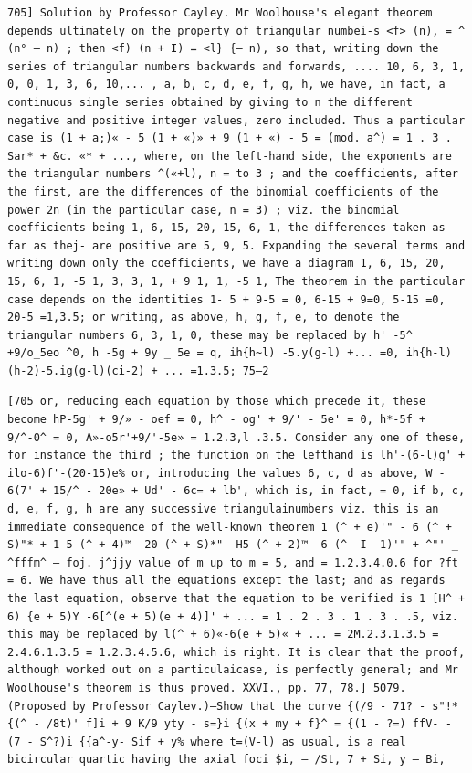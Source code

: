 \documentclass[12pt]{article}
\theoremstyle{plain}
\begin{document}
\newpage
\setcounter{page}{595}
\begin{verbatim}
705] Solution by Professor Cayley. Mr Woolhouse's elegant theorem depends ultimately on the property of triangular numbei-s <f> (n), = ^ (n° — n) ; then <f) (n + I) = <l} {— n), so that, writing down the series of triangular numbers backwards and forwards, .... 10, 6, 3, 1, 0, 0, 1, 3, 6, 10,... , a, b, c, d, e, f, g, h, we have, in fact, a continuous single series obtained by giving to n the different negative and positive integer values, zero included. Thus a particular case is (1 + a;)« - 5 (1 + «)» + 9 (1 + «) - 5 = (mod. a^) = 1 . 3 . Sar* + &c. «* + ..., where, on the left-hand side, the exponents are the triangular numbers ^(«+l), n = to 3 ; and the coefficients, after the first, are the differences of the binomial coefficients of the power 2n (in the particular case, n = 3) ; viz. the binomial coefficients being 1, 6, 15, 20, 15, 6, 1, the differences taken as far as thej- are positive are 5, 9, 5. Expanding the several terms and writing down only the coefficients, we have a diagram 1, 6, 15, 20, 15, 6, 1, -5 1, 3, 3, 1, + 9 1, 1, -5 1, The theorem in the particular case depends on the identities 1- 5 + 9-5 = 0, 6-15 + 9=0, 5-15 =0, 20-5 =1,3.5; or writing, as above, h, g, f, e, to denote the triangular numbers 6, 3, 1, 0, these may be replaced by h' -5^ +9/o_5eo ^0, h -5g + 9y _ 5e = q, ih{h~l) -5.y(g-l) +... =0, ih{h-l)(h-2)-5.ig(g-l)(ci-2) + ... =1.3.5; 75—2 
\end{verbatim}

\newpage
\setcounter{page}{596}
\begin{verbatim}
[705 or, reducing each equation by those which precede it, these become hP-5g' + 9/» - oef = 0, h^ - og' + 9/' - 5e' = 0, h*-5f + 9/^-0^ = 0, A»-o5r'+9/'-5e» = 1.2.3,l .3.5. Consider any one of these, for instance the third ; the function on the lefthand is lh'-(6-l)g' + ilo-6)f'-(20-15)e% or, introducing the values 6, c, d as above, W - 6(7' + 15/^ - 20e» + Ud' - 6c= + lb', which is, in fact, = 0, if b, c, d, e, f, g, h are any successive triangulainumbers viz. this is an immediate consequence of the well-known theorem 1 (^ + e)'" - 6 (^ + S)"* + 1 5 (^ + 4)™- 20 (^ + S)*" -H5 (^ + 2)™- 6 (^ -I- 1)'" + ^"' _ ^fffm^ — foj. j^jjy value of m up to m = 5, and = 1.2.3.4.0.6 for ?ft = 6. We have thus all the equations except the last; and as regards the last equation, observe that the equation to be verified is 1 [H^ + 6) {e + 5)Y -6[^(e + 5)(e + 4)]' + ... = 1 . 2 . 3 . 1 . 3 . .5, viz. this may be replaced by l(^ + 6)«-6(e + 5)« + ... = 2M.2.3.1.3.5 = 2.4.6.1.3.5 = 1.2.3.4.5.6, which is right. It is clear that the proof, although worked out on a particulaicase, is perfectly general; and Mr Woolhouse's theorem is thus proved. XXVI., pp. 77, 78.] 5079. (Proposed by Professor Caylev.)—Show that the curve {(/9 - 71? - s"!* {(^ - /8t)' f]i + 9 K/9 yty - s=}i {(x + my + f}^ = {(1 - ?=) ffV- - (7 - S^?)i {{a^-y- Sif + y% where t=(V-l) as usual, is a real bicircular quartic having the axial foci $i, — /St, 7 + Si, y — Bi, 
\end{verbatim}
\end{document}
